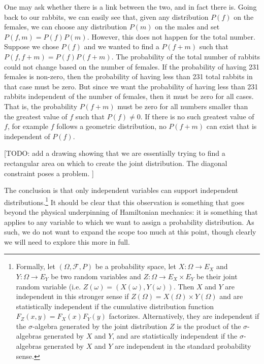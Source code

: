 One may ask whether there is a link between the two, and in fact there is. Going back to our rabbits, we can easily see that, given any distribution $P(f)$ on the females, we can choose any distribution $P(m)$ on the males and set $P(f,m)=P(f)P(m)$. However, this does not happen for the total number. Suppose we chose $P(f)$ and we wanted to find a $P(f+m)$ such that $P(f, f+m) = P(f)P(f+m)$. The probability of the total number of rabbits could not change based on the number of females. If the probability of having 231 females is non-zero, then the probability of having less than 231 total rabbits in that case must be zero. But since we want the probability of having less than 231 rabbits independent of the number of females, then it must be zero for all cases. That is, the probability $P(f+m)$ must be zero for all numbers smaller than the greatest value of $f$ such that $P(f) \neq 0$. If there is no such greatest value of $f$, for example $f$ follows a geometric distribution, no $P(f+m)$ can exist that is independent of $P(f)$.

[TODO: add a drawing showing that we are essentially trying to find a rectangular area on which to create the joint distribution. The diagonal constraint poses a problem. ]

The conclusion is that only independent variables can support independent distributions.\footnote{Formally, let $(\Omega, \mathcal{F}, P)$ be a probability space, let $X : \Omega \to E_X$ and $Y : \Omega \to E_Y$ be two random variables and $Z : \Omega \to E_X \times E_Y$ be their joint random variable (i.e. $Z(\omega) = (X(\omega), Y(\omega))$. Then $X$ and $Y$ are independent in this stronger sense if $Z(\Omega) = X(\Omega) \times Y(\Omega)$ and are statistically independent if the cumulative distribution function $F_Z(x,y)=F_X(x)F_Y(y)$ factorizes. Alternatively, they are independent if the $\sigma$-algebra generated by the joint distribution $Z$ is the product of the $\sigma$-algebras generated by $X$ and $Y$, and are statistically independent if the $\sigma$-algebras generated by $X$ and $Y$ are independent in the standard probability sense. } It should be clear that this observation is something that goes beyond the physical underpinning of Hamiltonian mechanics: it is something that applies to any variable to which we want to assign a probability distribution. As such, we do not want to expand the scope too much at this point, though clearly we will need to explore this more in full.

